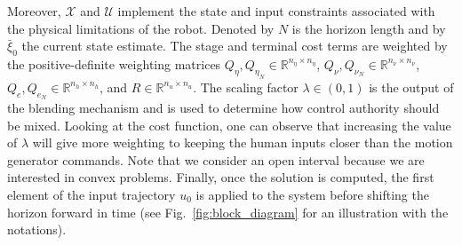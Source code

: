 Moreover, $\mathcal{X}$ and $\mathcal{U}$ implement the state and input constraints associated with the physical limitations of the robot. Denoted by $N$ is the horizon length and by $\bar{\xi}_0$ the current state estimate. The stage and terminal cost terms are weighted by the positive-definite weighting matrices $Q_{\eta}, Q_{\eta_N} \in \mathbb{R}^{n_\eta \times n_\eta}$, $Q_{\nu}, Q_{\nu_N} \in \mathbb{R}^{n_\nu \times n_\nu}$, $Q_{e}, Q_{e_N} \in \mathbb{R}^{n_h\times n_h}$, and $R \in \mathbb{R}^{n_u \times n_u}$. The scaling factor $\lambda \in (0,1)$ is the output of the blending mechanism and is used to determine how control authority should be mixed. Looking at the cost function, one can observe that increasing the value of $\lambda$ will give more weighting to keeping the human inputs closer than the motion generator commands. Note that we consider an open interval because we are interested in convex problems. Finally, once the solution is computed, the first element of the input trajectory $u_0$ is applied to the system before shifting the horizon forward in time (see Fig.~\ref{fig:block_diagram} for an illustration with the notations). 